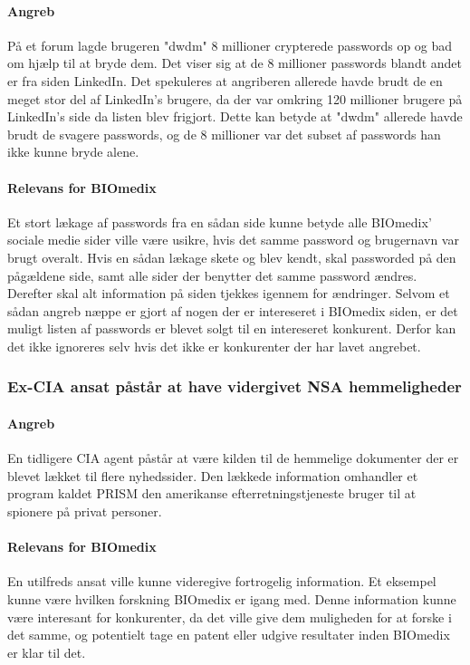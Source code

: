 \documentclass{article}
\begin{document}
\paragraph{Angreb}
På et forum lagde brugeren "dwdm" 8 millioner crypterede passwords op og bad om hjælp
til at bryde dem. Det viser sig at de 8 millioner passwords blandt andet er fra siden LinkedIn.
Det spekuleres at angriberen allerede havde brudt de en meget stor del af LinkedIn's brugere, da
der var omkring 120 millioner brugere på LinkedIn's side da listen blev frigjort. Dette kan betyde
at "dwdm" allerede havde brudt de svagere passwords, og de 8 millioner var det subset af passwords
han ikke kunne bryde alene\cite{LinkedInStory}.

\paragraph{Relevans for BIOmedix}

Et stort lækage af passwords fra en sådan side kunne betyde alle BIOmedix'
sociale medie sider ville være usikre, hvis det samme password og brugernavn var 
brugt overalt.
Hvis en sådan lækage skete og blev kendt, skal passworded på den pågældene side, samt
alle sider der benytter det samme password ændres. Derefter skal alt information på
siden tjekkes igennem for ændringer.
Selvom et sådan angreb næppe er gjort af nogen der er intereseret i BIOmedix siden, er
det muligt listen af passwords er blevet solgt til en intereseret konkurent. Derfor kan
det ikke ignoreres selv hvis det ikke er konkurenter der har lavet angrebet.

\subsubsection{Ex-CIA ansat påstår at have vidergivet NSA hemmeligheder} 

\paragraph{Angreb}
En tidligere CIA agent påstår at være kilden til de hemmelige dokumenter der er blevet
lækket til flere nyhedssider. Den lækkede information omhandler et program kaldet PRISM 
den amerikanse efterretningstjeneste bruger til at spionere på privat personer.

\paragraph{Relevans for BIOmedix}
En utilfreds ansat ville kunne videregive fortrogelig information. Et eksempel kunne være hvilken
forskning BIOmedix er igang med. Denne information kunne være interesant for konkurenter, da det ville
give dem muligheden for at forske i det samme, og potentielt tage en patent eller udgive resultater
inden BIOmedix er klar til det.
\end{document}
